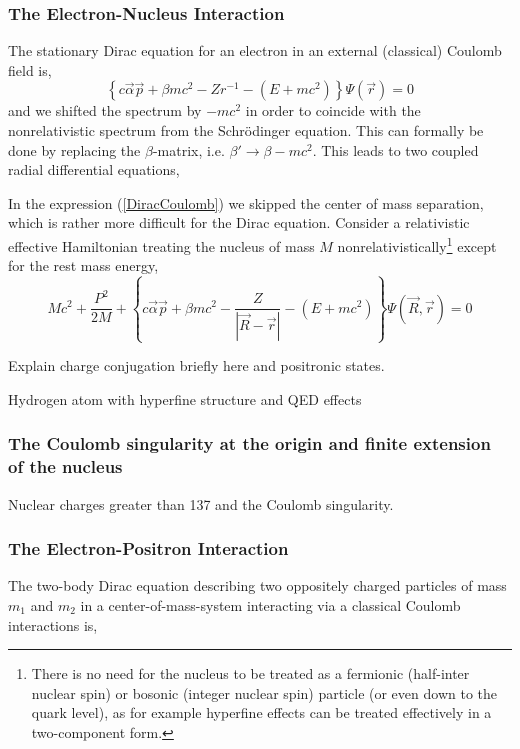 \documentclass[12pt]{article}
\begin{document}
\subsubsection{\label{Hatom} \sffamily The Electron-Nucleus Interaction}
The stationary Dirac equation for an electron in an external (classical) Coulomb field is,
\begin{equation}
   \left\{ c \vec{\alpha} \vec{p} + \beta mc^2 - Zr^{-1} - \left( E + mc^2\right)\right\} \Psi (\vec{r}) = 0
   \label{DiracCoulomb}
\end{equation}
and we shifted the spectrum by $-mc^2$ in order to coincide with the nonrelativistic spectrum from the Schr\"odinger equation. This can formally be done by replacing the $\beta$-matrix, i.e. $\beta'\rightarrow\beta-mc^2$. This leads to two coupled radial differential equations,


In the expression (\ref{DiracCoulomb}) we skipped the center of mass separation, which is rather more difficult for the Dirac equation.\cite{Bechert-Meixner-1935,Breit-1948,Barker-Glover-1955,sapirstein-Yennie-1990} Consider a relativistic effective Hamiltonian treating the nucleus of mass $M$ nonrelativistically\footnote{There is no need for the nucleus to be treated as a fermionic (half-inter nuclear spin) or bosonic (integer nuclear spin) particle (or even down to the quark level), as for example hyperfine effects can be treated effectively in a two-component form.} except for the rest mass energy,
\begin{equation}
   Mc^2 + \frac{P^2}{2M} + \left\{ c \vec{\alpha} \vec{p} + \beta mc^2 - \frac{Z}{|\vec{R}-\vec{r}|} - \left( E + mc^2\right)\right\} \Psi (\vec{R},\vec{r}) = 0
   \label{DiracCoulomb}
\end{equation}

Explain charge conjugation briefly here and positronic states.

Hydrogen atom with hyperfine structure and QED effects

\subsubsection{\sffamily The Coulomb singularity at the origin and finite extension of the nucleus}
Nuclear charges greater than 137 and the Coulomb singularity.

\subsubsection{\sffamily The Electron-Positron Interaction}
The two-body Dirac equation describing two oppositely charged particles of mass $m_1$ and $m_2$ in a center-of-mass-system interacting via a classical Coulomb interactions is,
\end{document}
